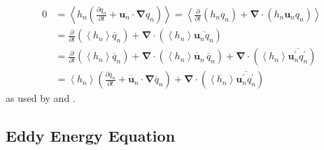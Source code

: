 \documentclass[12pt,a4paper]{report}
\newcommand*\thkmean[1]{\overline{#1}}
\newcommand*\thkres[1]{{#1}^{\prime}}
\newcommand*\nthkmean[1]{\left\langle{#1}\right\rangle}
\newcommand*{\partialdiff}[2][{}]{\frac{\partial #1}{\partial #2}}
\begin{document}
    \begin{equation}
    \begin{split}
    0&=\nthkmean{ h_{n} \left(\partialdiff[q_{n}]{t} + \boldsymbol{u}_{n} \cdot\boldsymbol{\nabla}q_{n} \right) } =
    \nthkmean{  \partialdiff{t}\left(h_{n}q_{n}\right) +  \boldsymbol{\nabla}\cdot\left(h_{n}\boldsymbol{u}_{n}q_{n} \right)}  \\
    &= \partialdiff{t} \left(\nthkmean{ h_{n} } \thkmean{q}_{n}\right)
    +  \boldsymbol{\nabla}\cdot\left( \nthkmean{ h_{n}}\thkmean{\boldsymbol{u}_{n}q_{n}} \right) \\
    &= \partialdiff{t} \left(\nthkmean{h_{n}} \thkmean{q}_{n}\right) +  \boldsymbol{\nabla}\cdot\left( \nthkmean{h_{n}} \thkmean{\boldsymbol{u}}_{n} \, \thkmean{q}_{n} \right) +  \boldsymbol{\nabla}\cdot\left( \nthkmean{h_{n}} \thkmean{\thkres{\boldsymbol{u}}_{n}\thkres{q}_{n}} \right) \\
    &= \nthkmean{h_{n}} \left(\partialdiff[\thkmean{q}_{n}]{t}+  \thkmean{\boldsymbol{u}}_{n}\cdot \boldsymbol{\nabla}\thkmean{q}_{n} \right) +  \boldsymbol{\nabla}\cdot\left( \nthkmean{h_{n}} \thkmean{\thkres{\boldsymbol{u}}_{n}\thkres{q}_{n}} \right)
    \end{split}
    \end{equation}
    as used by \cite{greatbatch1998exploring} and \cite{smith1999primitive}.
    
    
    
    \subsection{Eddy Energy Equation}
    \label{eddyenergyeqs}
    
\end{document}
